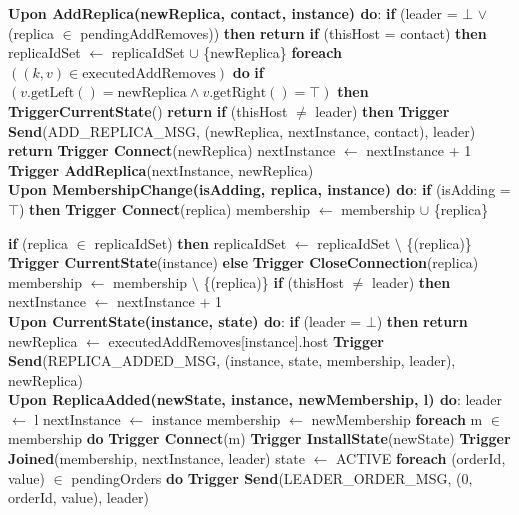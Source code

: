 \documentclass[sigconf]{acmart}
\begin{document}
\begin{algorithmic}[1]
\small
\State \textbf{Upon AddReplica(newReplica, contact, instance) do}:
\State \quad \textbf{if} (leader = $\bot$ $\lor$ (replica $\in$ pendingAddRemoves)) \textbf{then}
\State \quad \quad \textbf{return}
\State \quad \textbf{if} (thisHost = contact) \textbf{then}
\State \quad \quad replicaIdSet $\gets$ replicaIdSet $\cup$ \{newReplica\}
\State \quad \textbf{foreach} $((k, v) \in \text{executedAddRemoves})$ \textbf{do}
\State \quad \quad \textbf{if} $(v.\text{getLeft}() = \text{newReplica} \land v.\text{getRight}() = \top)$ \textbf{then}
\State \quad \quad \quad \textbf{TriggerCurrentState}()
\State \quad \quad \quad \textbf{return}
\State \quad \textbf{if} (thisHost $\neq$ leader) \textbf{then}
\State \quad \quad \textbf{Trigger Send}(ADD\_REPLICA\_MSG, (newReplica, nextInstance, contact), leader)
\State \quad \quad \textbf{return}
\State \quad \textbf{Trigger Connect}(newReplica)
\State \quad nextInstance $\gets$ nextInstance + 1
\State \quad \textbf{Trigger AddReplica}(nextInstance, newReplica) \\

\State \textbf{Upon MembershipChange(isAdding, replica, instance) do}:
\State \quad \textbf{if} (isAdding = $\top$) \textbf{then}
\State \quad \quad \quad \textbf{Trigger Connect}(replica)
\State \quad \quad \quad membership $\gets$ membership $\cup$ \{replica\}

\State \quad \quad \textbf{if} (replica $\in$ replicaIdSet) \textbf{then}
\State \quad \quad \quad replicaIdSet $\gets$ replicaIdSet $\setminus$ \{(replica)\}
\State \quad \quad \quad \textbf{Trigger CurrentState}(instance)
\State \quad \textbf{else}
\State \quad \quad \textbf{Trigger CloseConnection}(replica)
\State \quad \quad membership $\gets$ membership $\setminus$ \{(replica)\}
\State \quad \textbf{if} (thisHost $\neq$ leader) \textbf{then}
\State \quad \quad nextInstance $\gets$ nextInstance + 1 \\

\State \textbf{Upon CurrentState(instance, state) do}:
\State \quad \textbf{if} (leader = $\bot$) \textbf{then}
\State \quad \quad \textbf{return}
\State \quad newReplica $\gets$ executedAddRemoves[instance].host
\State \quad \textbf{Trigger Send}(REPLICA\_ADDED\_MSG, (instance, state, membership, leader), newReplica) \\

\State \textbf{Upon ReplicaAdded(newState, instance, newMembership, l) do}:
\State \quad leader $\gets$ l
\State \quad nextInstance $\gets$ instance
\State \quad membership $\gets$ newMembership
\State \quad \textbf{foreach} m $\in$ membership \textbf{do}
\State \quad \quad \textbf{Trigger Connect}(m)
\State \quad \textbf{Trigger InstallState}(newState)
\State \quad \textbf{Trigger Joined}(membership, nextInstance, leader)
\State \quad state $\gets$ ACTIVE
\State \quad \textbf{foreach} (orderId, value) $\in$ pendingOrders \textbf{do}
\State \quad \quad \textbf{Trigger Send}(LEADER\_ORDER\_MSG, (0, orderId, value), leader) \\


\end{algorithmic}
\end{document}
